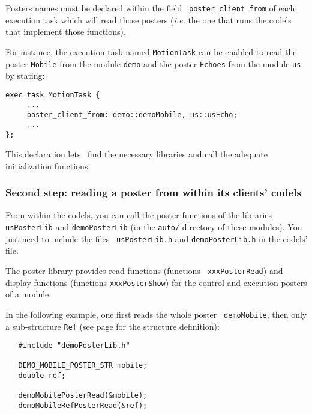 Posters  names    must     be    declared   within    the      field {\tt
poster\_client\_from}   of each execution   task  which  will read  those
posters ({\em i.e.}  the one that runs   the codels that implement  those
functions).

For instance, the execution task named {\tt MotionTask} can be enabled to
read the poster  {\tt Mobile} from the  module {\tt demo} and  the poster
{\tt Echoes} from the module {\tt us} by stating:

\begin{center}\begin{cartouche}\small\begin{verbatim}
exec_task MotionTask {
     ...
     poster_client_from: demo::demoMobile, us::usEcho;
     ...
};
\end{verbatim}\end{cartouche}\end{center}

This declaration lets  \GenoM\ find the necessary  libraries and call the
adequate  initialization functions.


\subsubsection{Second step: reading a poster from within its clients'
codels}

From  within the  codels,   you can call  the  poster  functions   of the
libraries {\tt usPosterLib} and {\tt  demoPosterLib} (in the {\tt  auto/}
directory of  these modules).  You just  need to include  the  files {\tt
usPosterLib.h} and {\tt demoPosterLib.h} in the codels' file.

The  poster    library   provides   read   functions     (functions  {\tt
xxxPosterRead}) and display functions (functions {\tt xxxPosterShow}) for
the control and execution posters of a module.

In  the  following  example, one  first   reads   the whole poster   {\tt
demoMobile}, then only a sub-structure {\tt Ref} (see page
\pageref{typedef|demomobile} for the structure definition):

\begin{center}\begin{cartouche}\small\begin{verbatim}
   #include "demoPosterLib.h"

   DEMO_MOBILE_POSTER_STR mobile;
   double ref;

   demoMobilePosterRead(&mobile);
   demoMobileRefPosterRead(&ref);
\end{verbatim}\end{cartouche}\end{center}

